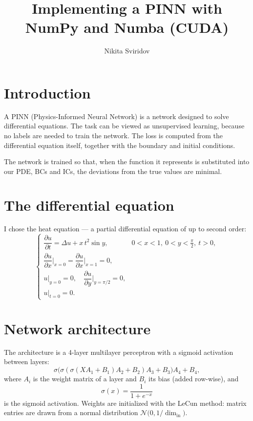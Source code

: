 \documentclass[12pt,a4paper]{article}
\title{\textbf{Implementing a PINN with\\ NumPy and Numba (CUDA)}}
\author{Nikita Sviridov}
\date{}
\begin{document}
\maketitle

\section{Introduction}

A PINN (Physics-Informed Neural Network) is a network designed to solve
differential equations. The task can be viewed as unsupervised learning, because
no labels are needed to train the network. The loss is computed from the
differential equation itself, together with the boundary and initial conditions.

The network is trained so that, when the function it represents is substituted
into our PDE, BCs and ICs, the deviations from the true values are minimal.

\section{The differential equation}

I chose the heat equation --- a partial differential equation of up to second
order:
\begin{equation*}
\begin{cases}
\dfrac{\partial u}{\partial t} = \Delta u + x\,t^2 \sin y, & 0 < x < 1,\ 0 < y < \tfrac{\pi}{2},\ t > 0,\\[2mm]
\dfrac{\partial u}{\partial x}\Big|_{x=0} = \dfrac{\partial u}{\partial x}\Big|_{x=1} = 0, & \\[2mm]
u\big|_{y=0} = 0, \quad \dfrac{\partial u}{\partial y}\Big|_{y=\pi/2} = 0, & \\[2mm]
u\big|_{t=0} = 0. &
\end{cases}
\end{equation*}

\section{Network architecture}

The architecture is a 4-layer multilayer perceptron with a sigmoid activation
between layers:
\[
\sigma\!\big(\sigma(\sigma(X A_1 + B_1)A_2 + B_2)A_3 + B_3\big)A_4 + B_4,
\]
where $A_i$ is the weight matrix of a layer and $B_i$ its bias (added row-wise),
and
\[
\sigma(x) = \frac{1}{1 + e^{-x}}
\]
is the sigmoid activation. Weights are initialized with the LeCun method:
matrix entries are drawn from a normal distribution
$\mathcal{N}\!\big(0, 1/\dim_{\text{in}}\big)$.
\end{document}
